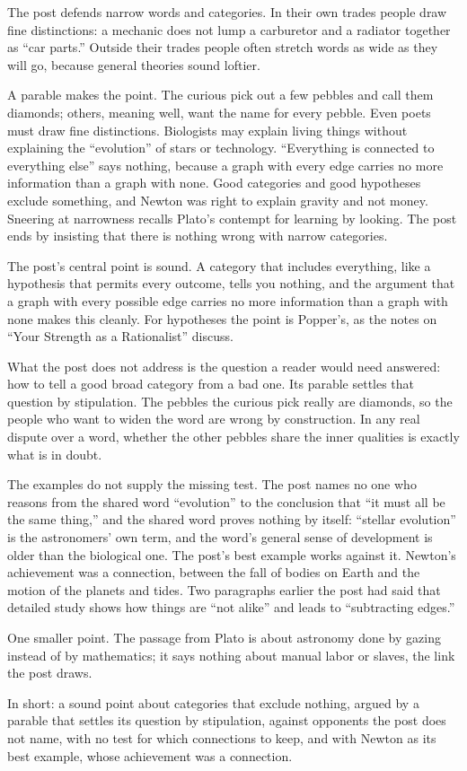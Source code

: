 \begin{afterword}
\summaryhead

The post defends narrow words and categories. In their own trades people draw fine distinctions: a mechanic does not lump a carburetor and a radiator together as ``car parts.'' Outside their trades people often stretch words as wide as they will go, because general theories sound loftier.

A parable makes the point. The curious pick out a few pebbles and call them diamonds; others, meaning well, want the name for every pebble. Even poets must draw fine distinctions. Biologists may explain living things without explaining the ``evolution'' of stars or technology. ``Everything is connected to everything else'' says nothing, because a graph with every edge carries no more information than a graph with none. Good categories and good hypotheses exclude something, and Newton was right to explain gravity and not money. Sneering at narrowness recalls Plato's contempt for learning by looking. The post ends by insisting that there is nothing wrong with narrow categories.

\responsehead

The post's central point is sound. A category that includes everything, like a hypothesis that permits every outcome, tells you nothing, and the argument that a graph with every possible edge carries no more information than a graph with none makes this cleanly. For hypotheses the point is Popper's, as the notes on ``Your Strength as a Rationalist'' discuss.

What the post does not address is the question a reader would need answered: how to tell a good broad category from a bad one. Its parable settles that question by stipulation. The pebbles the curious pick really are diamonds, so the people who want to widen the word are wrong by construction. In any real dispute over a word, whether the other pebbles share the inner qualities is exactly what is in doubt.

The examples do not supply the missing test. The post names no one who reasons from the shared word ``evolution'' to the conclusion that ``it must all be the same thing,'' and the shared word proves nothing by itself: ``stellar evolution'' is the astronomers' own term, and the word's general sense of development is older than the biological one. The post's best example works against it. Newton's achievement was a connection, between the fall of bodies on Earth and the motion of the planets and tides. Two paragraphs earlier the post had said that detailed study shows how things are ``not alike'' and leads to ``subtracting edges.''

One smaller point. The passage from Plato is about astronomy done by gazing instead of by mathematics; it says nothing about manual labor or slaves, the link the post draws.

In short: a sound point about categories that exclude nothing, argued by a parable that settles its question by stipulation, against opponents the post does not name, with no test for which connections to keep, and with Newton as its best example, whose achievement was a connection.
\end{afterword}
